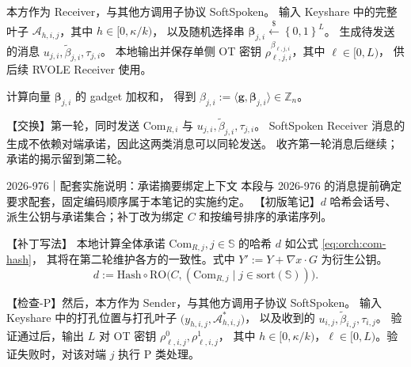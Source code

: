 本方作为 Receiver，与其他方调用子协议 SoftSpoken。
输入 Keyshare 中的完整叶子 $\mathcal{A}_{h,i,j}$，其中 $h\in[0,\kappa/k)$，
以及随机选择串 $\boldsymbol{\beta}_{j,i} \stackrel{\$}{\leftarrow} \left\{0,1\right\}^L$。
生成待发送的消息 $u_{j,i}, \tilde{\beta}_{j,i}, \tau_{j,i}$。
本地输出并保存单侧 OT 密钥 $\rho^{\beta_{\ell,j,i}}_{\ell,j,i}$，其中 $\ell\in[0,L)$，
供后续 RVOLE Receiver 使用。

计算向量 $\boldsymbol{\beta}_{j,i}$ 的 gadget 加权和，
得到 $\beta_{j,i}:=\langle \boldsymbol{g}, \boldsymbol{\beta}_{j,i}\rangle \in \mathbb{Z}_n$。

【交换】第一轮，同时发送 $\mathrm{Com}_{R,i}$ 与 $u_{j,i}, \tilde{\beta}_{j,i}, \tau_{j,i}$。
SoftSpoken Receiver 消息的生成不依赖对端承诺，因此这两类消息可以同轮发送。
收齐第一轮消息后继续；承诺的揭示留到第二轮。

\begin{patchnote}{2026-976｜配套实施说明：承诺摘要绑定上下文}
本段与 2026-976 的消息提前确定要求配套，固定编码顺序属于本笔记的实施约定。
【初版笔记】$d$ 哈希会话号、派生公钥与承诺集合；补丁改为绑定 $C$ 和按编号排序的承诺序列。

【补丁写法】
本地计算全体承诺 $\mathrm{Com}_{R,j}, j\in\mathbb{S}$ 的哈希 $d$ 如公式 \eqref{eq:orch:com-hash}，
其将在第二轮维护各方的一致性。式中 $Y' := Y+\nabla x \cdot G$ 为衍生公钥。
\begin{equation}
  \label{eq:orch:com-hash}\tag{com-hash}
  d := \mathrm{Hash}
  \circ \mathrm{RO}\bigl(C,(\mathrm{Com}_{R,j} \mid j\in\mathrm{sort}(\mathbb S))\bigr).
\end{equation}
\end{patchnote}

【检查-P】然后，本方作为 Sender，与其他方调用子协议 SoftSpoken。
输入 Keyshare 中的打孔位置与打孔叶子 $\bigl(y_{h,i,j}, \mathcal{A}^*_{h,i,j}\bigr)$，
以及收到的 $u_{i,j}, \tilde{\beta}_{i,j}, \tau_{i,j}$。
验证通过后，输出 $L$ 对 OT 密钥 $\rho^0_{\ell,i,j}, \rho^1_{\ell,i,j}$，
其中 $h\in[0,\kappa/k)$，$\ell\in[0,L)$。验证失败时，对该对端 $j$ 执行 P 类处理。


